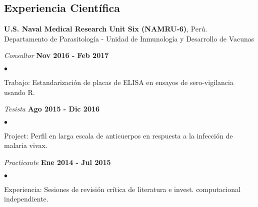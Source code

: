 \documentclass[margin,line]{res}
\newenvironment{list1}{
	\begin{list}{\ding{113}}{%
			\setlength{\itemsep}{0in}
			\setlength{\parsep}{0in} \setlength{\parskip}{0in}
			\setlength{\topsep}{0in} \setlength{\partopsep}{0in}
			\setlength{\leftmargin}{0.17in}}}{\end{list}}
\newenvironment{list2}{
	\begin{list}{$\bullet$}{%
			\setlength{\itemsep}{0in}
			\setlength{\parsep}{0in} \setlength{\parskip}{0in}
			\setlength{\topsep}{0in} \setlength{\partopsep}{0in}
			\setlength{\leftmargin}{0.2in}}}{\end{list}}
\begin{document}
\begin{resume}
		
		\section{\sc Experiencia Científica}
		
		{\bf U.S. Naval Medical Research Unit Six (NAMRU-6)}, Perú.\\
		Departamento de Parasitología - Unidad de Inmunología y Desarrollo de Vacunas\\
		\vspace*{-.1in}
		\begin{list1}
			\item[] {\em Consultor} \hfill {\bf Nov 2016 - Feb 2017}\\
			\vspace*{-.1in}
			\begin{list2}
				\item Trabajo: Estandarización de placas de ELISA en ensayos de sero-vigilancia usando R.\\
			\end{list2}
			\vspace*{-.1in}
			\item[] {\em Tesista} \hfill {\bf Ago 2015 - Dic 2016}\\
			\vspace*{-.1in}
			\begin{list2}
				\item Project: Perfil en larga escala de anticuerpos en respuesta a la infección de malaria vivax.\\
			\end{list2}
			\vspace*{-.1in}
			\item[] {\em Practicante} \hfill {\bf Ene 2014 - Jul 2015}\\
			\vspace*{-.1in}
			\begin{list2} %
				\item Experiencia: Sesiones de revisión crítica de literatura e invest. computacional independiente.
			\end{list2}
		\end{list1}
		

\end{resume}
\end{document}
